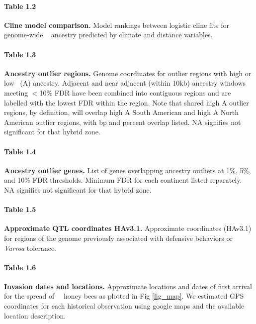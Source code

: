 \paragraph*{Table 1.2}
\label{table_AIC_climate_clines}
{\bf Cline model comparison.} Model rankings between logistic cline fits for genome-wide \scutellata\  ancestry predicted by climate and distance variables.


\paragraph*{Table 1.3}
\label{table_outliers}
{\bf Ancestry outlier regions.} Genome coordinates for outlier regions with high or low \scutellata\ (A) ancestry. Adjacent and near adjacent (within 10kb) ancestry windows meeting $<$10\% FDR have been combined into contiguous regions and are labelled with the lowest FDR within the region. Note that shared high A outlier regions, by definition, will overlap high A South American and high A North American outlier regions, with bp and percent overlap listed. NA signifies not significant for that hybrid zone.

\paragraph*{Table 1.4}
\label{table_genes}
{\bf Ancestry outlier genes.} List of genes overlapping ancestry outliers at 1\%, 5\%, and 10\% FDR thresholds. Minimum FDR for each continent listed separately. NA signifies not significant for that hybrid zone.

\paragraph*{Table 1.5}
\label{table_qtl}
{\bf Approximate QTL coordinates HAv3.1.} Approximate coordinates (HAv3.1) for regions of the genome previously associated with defensive behaviors or \textit{Varroa} tolerance.

\paragraph*{Table 1.6}
\label{table_hx_dates}
{\bf Invasion dates and locations.} Approximate locations and dates of first arrival for the spread of \africanized\ \hyb\ honey bees as plotted in Fig \ref{fig_map}. We estimated GPS coordinates for each historical observation using google maps and the available location description.
\newline


